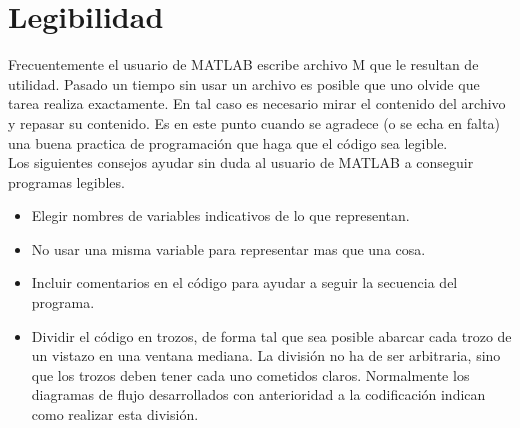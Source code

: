 \section{Legibilidad}

Frecuentemente el usuario de MATLAB escribe archivo M que le resultan de utilidad. Pasado un tiempo sin usar un archivo es posible que uno olvide que tarea realiza exactamente. En tal caso es necesario mirar el contenido del archivo y repasar su contenido. Es en este punto cuando se agradece (o se echa en falta) una buena practica de programación que haga que el código sea legible.\\

Los siguientes consejos ayudar sin duda al usuario de MATLAB a conseguir programas legibles.
\begin{itemize}
\item Elegir nombres de variables indicativos de lo que representan.
\item No usar una misma variable para representar mas que una cosa.
\item Incluir comentarios en el código para ayudar a seguir la secuencia del programa.
\item Dividir el código en trozos, de forma tal que sea posible abarcar cada trozo de un vistazo en una ventana mediana. La división no ha de ser arbitraria, sino que los trozos deben tener cada uno cometidos claros. Normalmente los diagramas de flujo desarrollados con anterioridad a la codificación indican como realizar esta división.
\end{itemize}